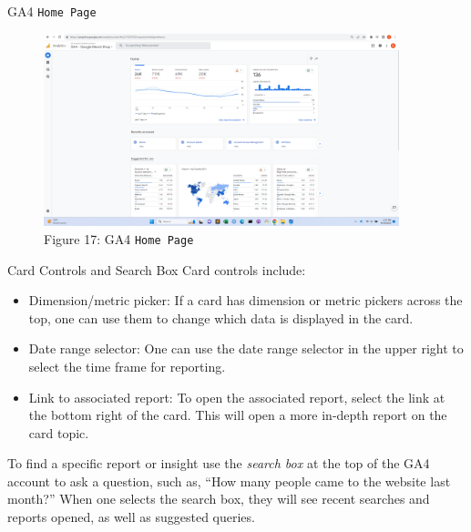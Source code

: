 \documentclass[pdf]{beamer}
\theoremstyle{remark}
\theoremstyle{definition}
\begin{document}
\begin{frame}[t]{GA4 \texttt{Home Page}}
\begin{figure}[htbp]
  \captionsetup{justification=centering}
  \includegraphics[height=5.6cm, trim=1.5cm 0.0cm 2.0cm 0.0cm width=5.6cm]{Images/G4A_6a_091923_Homepage_and_Search_Bar.png}
  \caption{Figure {\color{franklinblue} 17}: GA4 \texttt{Home Page}}
\end{figure}
\end{frame}

\begin{frame}[t]{Card Controls and Search Box}
Card controls include: \\
\vspace{0.5ex}
\small
\begin{itemize}
\item Dimension/metric picker: If a card has dimension or metric pickers across the top, one can use them to change which data is displayed in the card. 
\item Date range selector: One can use the date range selector in the upper right to select the time frame for reporting. 
\item Link to associated report: To open the associated report, select the link at the bottom right of the card. This will open a more in-depth report on the card topic.
\end{itemize}
\normalsize
To find a specific report or insight use the \textit{search box} at the top of the GA4 account to ask a question, such as,  ``How many people came to the website last month?'' When one selects the search box, they will see recent searches and reports opened, as well as suggested queries.
\end{frame}
\end{document}
